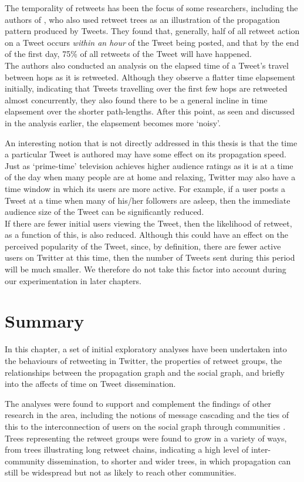 The temporality of retweets has been the focus of some researchers, including the authors of \cite{kwak10}, who also used retweet trees as an illustration of the propagation pattern produced by Tweets. They found that, generally, half of all retweet action on a Tweet occurs \textit{within an hour} of the Tweet being posted, and that by the end of the first day, 75\% of all retweets of the Tweet will have happened.\\
The authors also conducted an analysis on the elapsed time of a Tweet's travel between hops as it is retweeted. Although they observe a flatter time elapsement initially, indicating that Tweets travelling over the first few hops are retweeted almost concurrently, they also found there to be a general incline in time elapsement over the shorter path-lengths. After this point, as seen and discussed in the analysis earlier, the elapsement becomes more `noisy'. 

An interesting notion that is not directly addressed in this thesis is that the time a particular Tweet is authored may have some effect on its propagation speed. Just as `prime-time' television achieves higher audience ratings as it is at a time of the day when many people are at home and relaxing, Twitter may also have a time window in which its users are more active. For example, if a user posts a Tweet at a time when many of his/her followers are asleep, then the immediate audience size of the Tweet can be significantly reduced.\\
If there are fewer initial users viewing the Tweet, then the likelihood of retweet, as a function of this, is also reduced. Although this could have an effect on the perceived popularity of the Tweet, since, by definition, there are fewer active users on Twitter at this time, then the number of Tweets sent during this period will be much smaller. We therefore do not take this factor into account during our experimentation in later chapters.


\section{Summary}
In this chapter, a set of initial exploratory analyses have been undertaken into the behaviours of retweeting in Twitter, the properties of retweet groups, the relationships between the propagation graph and the social graph, and briefly into the affects of time on Tweet dissemination.

The analyses were found to support and complement the findings of other research in the area, including the notions of message cascading \cite{galuba10} and the ties of this to the interconnection of users on the social graph through communities \cite{java07}.\\
Trees representing the retweet groups were found to grow in a variety of ways, from trees illustrating long retweet chains, indicating a high level of inter-community dissemination, to shorter and wider trees, in which propagation can still be widespread but not as likely to reach other communities.

